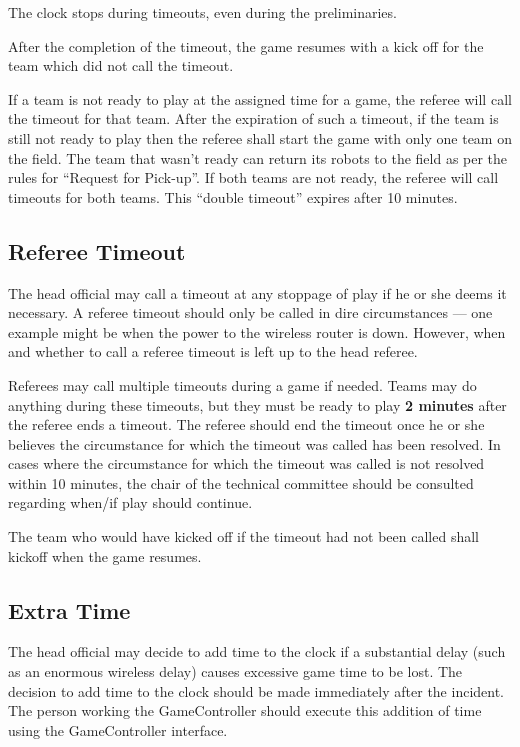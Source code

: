 \documentclass[12pt]{article}
\begin{document}
The clock stops during timeouts, even during the preliminaries.

After the completion of the timeout, the game resumes with a kick off for the team which did not call the timeout.

If a team is not ready to play at the assigned time for a game, the referee will call the timeout for that team. After the expiration of such a timeout, if the team is still not ready to play then the referee shall start the game with only one team on the field.  The team that wasn't ready can return its robots to the field as per the rules for ``Request for Pick-up''. If both teams are not ready, the referee will call timeouts for both teams. This ``double timeout'' expires after 10 minutes.

\subsection{Referee Timeout}
\label{sec:referee_timeout}
The head official may call a timeout at any stoppage of play if he or she deems it necessary.  A referee timeout should only be called in dire circumstances --- one example might be when the power to the wireless router is down.  However, when and whether to call a referee timeout is left up to the head referee.

Referees may call multiple timeouts during a game if needed.  Teams may do anything during these timeouts, but they must be ready to play \textbf{2 minutes} after the referee ends a timeout.  The referee should end the timeout once he or she believes the circumstance for which the timeout was called has been resolved.  In cases where the circumstance for which the timeout was called is not resolved within 10 minutes, the chair of the technical committee should be consulted regarding when/if play should continue.

The team who would have kicked off if the timeout had not been called shall kickoff when the game resumes.

\subsection{Extra Time}
\label{sec:extra_time}
The head official may decide to add time to the clock if a substantial delay (such as an enormous wireless delay) causes excessive game time to be lost.  The decision to add time to the clock should be made immediately after the incident.  The person working the GameController should execute this addition of time using the GameController interface.
\end{document}
